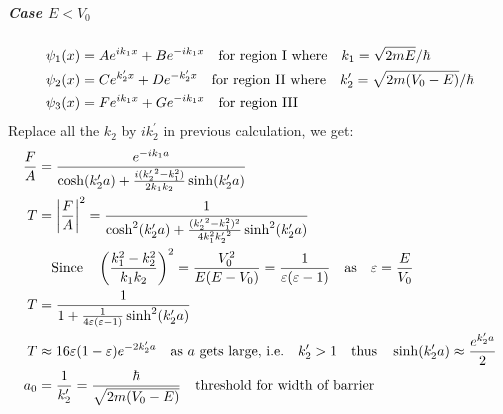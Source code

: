 \documentclass[a4paper,10pt]{article}
\begin{document}
\subparagraph{Case $E<V_0$}
\begin{align*}
    \psi_1(x) & =Ae^{ik_1x}+Be^{-ik_1x}\qq{for region I where}k_1=\sqrt{2mE}/\hbar                             \\
    \psi_2(x) & =Ce^{k_2^\prime x}+De^{-k_2^\prime x}\qq{for region II where}k_2^\prime=\sqrt{2m(V_0-E)}/\hbar \\
    \psi_3(x) & =Fe^{ik_1x}+Ge^{-ik_1x}\qq{for region III}
\end{align*}
Replace all the $k_2$ by $ik_2^\prime$ in previous calculation, we get:
\begin{align*}
    \frac{F}{A} & =\frac{e^{-ik_1a}}{\cosh(k_2^\prime a)+\frac{i({k_2^\prime}^2-k_1^2)}{2k_1k_2}\sinh(k_2^\prime a)}                                                          \\
    T           & =\abs{\frac{F}{A}}^2=\frac{1}{\cosh^2(k_2^\prime a)+\frac{({k_2^\prime}^2-k_1^2)^2}{4k_1^2{k_2^\prime}^2}\sinh^2(k_2^\prime a)}                             \\
                & \qq{Since} \left(\frac{k_1^2-k_2^2}{k_1k_2}\right)^2=\frac{V_0^2}{E(E-V_0)}=\frac{1}{\varepsilon(\varepsilon-1)}\qq{as}\varepsilon=\frac{E}{V_0}            \\
    T           & =\frac{1}{1+\frac{1}{4\varepsilon(\varepsilon-1)}\sinh^2(k_2^\prime a)}                                                                                     \\
    T           & \approx 16\varepsilon(1-\varepsilon)e^{-2k_2^\prime a}\qq{as $a$ gets large, i.e.}k_2^\prime>1\qq{thus}\sinh(k_2^\prime a)\approx\frac{e^{k_2^\prime a}}{2} \\
    a_0         & =\frac{1}{k_2^\prime}=\frac{\hbar}{\sqrt{2m(V_0-E)}}\qq{threshold for width of barrier}                                                                     \\
\end{align*}
\end{document}
